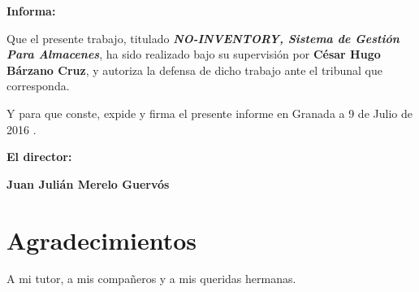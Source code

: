 \textbf{Informa:}

\vspace{0.5cm}

Que el presente trabajo, titulado \textit{\textbf{NO-INVENTORY, Sistema de Gestión Para Almacenes}},
ha sido realizado bajo su supervisión por \textbf{César Hugo Bárzano Cruz}, y autoriza la defensa de dicho trabajo ante el tribunal que corresponda.

\vspace{0.5cm}

Y para que conste, expide y firma el presente informe en Granada a 9 de Julio de 2016 .

\vspace{1cm}

\textbf{El director:}

\vspace{5cm}

\noindent \textbf{Juan Julián Merelo Guervós \ \ \ \ \ }

\chapter*{Agradecimientos}
\thispagestyle{empty}

       \vspace{1cm}


A mi tutor, a mis compañeros y a mis queridas hermanas. 


